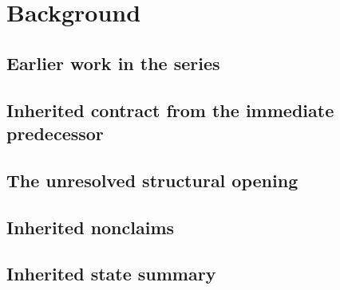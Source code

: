 \section{Background}\label{sec:background}


\subsection{Earlier work in the series}\label{subsec:earlier-work}


\subsection{Inherited contract from the immediate predecessor}\label{subsec:inherited-contract}


\subsection{The unresolved structural opening}\label{subsec:unresolved-opening}


\subsection{Inherited nonclaims}\label{subsec:inherited-nonclaims}


\subsection{Inherited state summary}\label{subsec:inherited-state-table}

% 
